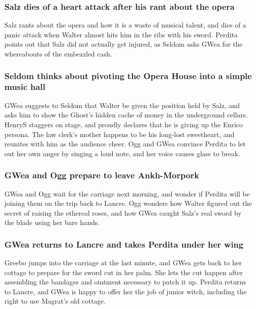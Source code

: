 \subsubsection{\Gls{Salz} dies of a heart attack after his rant about the opera}
\Gls{Salz} rants about the opera and how it is a waste of musical talent, and dies of a panic attack 
when \Gls{Walter} almost hits him in the ribs with his sword. \Gls{Perdita} points out that 
\Gls{Salz} did not actually get injured, as \Gls{Seldom} asks \Gls{GWea} for the whereabouts of the 
embezzled cash.

\subsubsection{\Gls{Seldom} thinks about pivoting the Opera House into a simple music hall}
\Gls{GWea} suggests to \Gls{Seldom} that \Gls{Walter} be given the position held by \Gls{Salz}, 
and asks him to show the \Gls{Ghost}'s hidden cache of money in the underground cellars.
\Gls{HenryS} staggers on stage, and proudly declares that he is giving up the \Gls{Enrico} persona.
The law clerk's mother happens to be his long-lost sweetheart, and reunites with him as the audience 
cheer. \Gls{Ogg} and \Gls{GWea} convince \Gls{Perdita} to let out her own anger by singing a loud 
note, and her voice causes glass to break.

\subsubsection{\Gls{GWea} and \Gls{Ogg} prepare to leave Ankh-Morpork}
\Gls{GWea} and \Gls{Ogg} wait for the carriage next morning, and wonder if \Gls{Perdita} will be 
joining them on the trip back to Lancre. \Gls{Ogg} wonders how \Gls{Walter} figured out the secret 
of raising the ethereal roses, and how \Gls{GWea} caught \Gls{Salz}'s real sword by the blade using 
her bare hands.

\subsubsection{\Gls{GWea} returns to Lancre and takes \Gls{Perdita} under her wing}
\Gls{Greebo} jumps into the carriage at the last minute, and \Gls{GWea} gets back to her cottage to 
prepare for the sword cut in her palm. She lets the cut happen after assembling the bandages and 
ointment necessary to patch it up. \Gls{Perdita} returns to Lancre, and \Gls{GWea} is happy to offer 
her the job of junior witch, including the right to use \Gls{Magrat}'s old cottage.